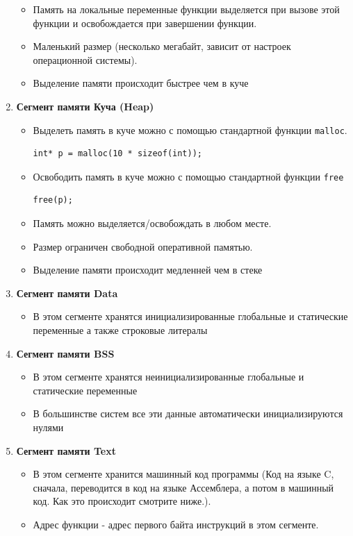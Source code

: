 \documentclass{article}
\begin{document}
\begin{multicols}{2}
\begin{enumerate}
\begin{itemize}
\item Память на локальные переменные функции выделяется при вызове этой функции и освобождается при завершении функции.
\item Маленький размер (несколько мегабайт, зависит от настроек операционной системы).
\item Выделение памяти происходит быстрее чем в куче
\end{itemize}
\item \textbf{Сегмент памяти Куча (Heap)} \\
\begin{itemize}
\item Выделеть память в куче можно с помощью стандартной функции \texttt{malloc}. \\
\begin{lstlisting}
int* p = malloc(10 * sizeof(int));
\end{lstlisting}
\item Освободить память в куче можно с помощью стандартной функции \texttt{free}
\begin{lstlisting}
free(p);
\end{lstlisting}
\item Память можно выделяется/освобождать в любом месте.
\item Размер ограничен свободной оперативной памятью.
\item Выделение памяти происходит медленней чем в стеке
\end{itemize}
\end{enumerate}
\end{multicols}

\begin{enumerate}
\setcounter{enumi}{2}

\item \textbf{Сегмент памяти Data}
\begin{itemize}
\item В этом сегменте хранятся инициализированные глобальные и статические переменные а также строковые литералы
\end{itemize}

\item \textbf{Сегмент памяти BSS}
\begin{itemize}
\item В этом сегменте хранятся неинициализированные глобальные и статические переменные
\item В большинстве систем все эти данные автоматически инициализируются нулями
\end{itemize}

\item \textbf{Сегмент памяти Text}
\begin{itemize}
\item В этом сегменте хранится машинный код программы (Код на языке C, сначала, переводится в код на языке Ассемблера, а потом в машинный код. Как это происходит смотрите ниже.).
\item Адрес функции - адрес первого байта инструкций в этом сегменте.
\end{itemize}
\end{enumerate}
\end{document}
